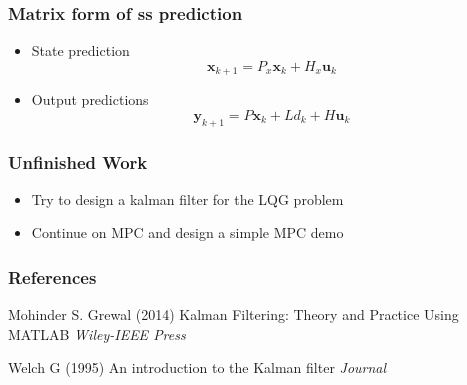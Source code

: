 \documentclass{beamer}
\begin{document}
\begin{frame}
\frametitle{Matrix form of ss prediction}

\begin{itemize}
	\item State prediction
	\begin{equation}
	\textbf{x}_{k+1}=P_{x} \textbf{x}_{k}+H_{x} \textbf{u}_{k}
	\end{equation}
	
	\item Output predictions
	\begin{equation}
	\textbf{y}_{k+1}=P \textbf{x}_{k}+L d_{k}+H \textbf{u}_{k}
	\end{equation}
\end{itemize}

\end{frame}

\begin{frame}
\frametitle{Unfinished Work}
\begin{itemize}
	\item Try to design a kalman filter for the LQG problem
	\item Continue on MPC and design a simple MPC demo
\end{itemize}

\end{frame}















\begin{frame}
\frametitle{References}
\footnotesize{
\begin{thebibliography}{99} %
 Mohinder S. Grewal (2014)
\newblock Kalman Filtering: Theory and Practice Using MATLAB
\newblock \emph{ Wiley-IEEE Press} 
\end{thebibliography}

\begin{thebibliography}{100} %
	 Welch G (1995)
	\newblock An introduction to the Kalman filter
	\newblock \emph{Journal} 
\end{thebibliography}
}
\end{frame}


\end{document}
